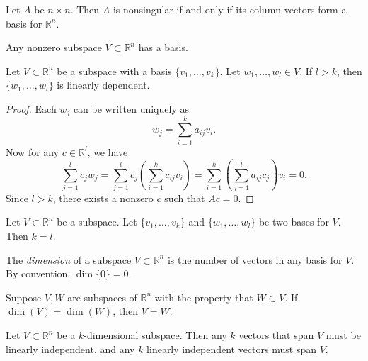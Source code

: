 \documentclass[12pt]{article}
\begin{document}
\begin{corollary}
	Let $A$ be $n\times n$. Then $A$ is nonsingular if and only if its column vectors form a basis for $\mathbb{R}^n$.
\end{corollary}

\begin{theorem}
	Any nonzero subspace $V\subset\mathbb{R}^n$ has a basis.
\end{theorem}

\begin{proposition}
	Let $V\subset\mathbb{R}^n$ be a subspace with a basis $\{v_1,\dots,v_k\}$. Let $w_1,\dots, w_l\in V$. If $l>k$, then $\{w_1,\dots, w_l\}$ is linearly dependent.
\end{proposition}
\begin{proof}
	Each $w_j$ can be written uniquely as
	\begin{equation*}
		w_j=\sum_{i=1}^k a_{ij}v_i.
	\end{equation*}
	Now for any $c\in \mathbb{R}^l$, we have 
	\begin{equation*}
		\sum_{j=1}^l c_jw_j = \sum_{j=1}^l c_j (\sum_{i=1}^k c_{ij}v_i) = \sum_{i=1}^k (\sum_{j=1}^l a_{ij}c_j)v_i = 0.
	\end{equation*}
	Since $l>k$, there exists a nonzero $c$ such that $Ac=0$.
\end{proof}

\begin{theorem}
	Let $V\subset\mathbb{R}^n$ be a subspace. Let $\{v_1,\dots,v_k\}$ and $\{w_1,\dots,w_l\}$ be two bases for $V$. Then $k=l$.
\end{theorem}

\begin{definition}
	The \emph{dimension} of a subspace $V\subset\mathbb{R}^n$ is the number of vectors in any basis for $V$. By convention, $\dim\{0\}=0$.
\end{definition}

\begin{lemma}
	Suppose $V,W$ are subspaces of $\mathbb{R}^n$ with the property that $W\subset V$. If $\dim(V)=\dim(W)$, then $V=W$.
\end{lemma}

\begin{proposition}
	Let $V\subset\mathbb{R}^n$ be a $k$-dimensional subspace. Then any $k$ vectors that span $V$ must be linearly independent, and any $k$ linearly independent vectors must span $V$.
\end{proposition}

\end{document}
